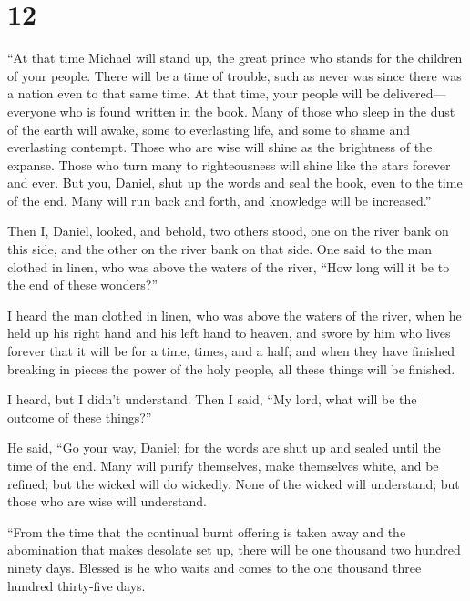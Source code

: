 \hypertarget{section-11}{%
\section{12}\label{section-11}}

 ``At that time Michael will stand up, the great prince
who stands for the children of your people. There will be a time of
trouble, such as never was since there was a nation even to that same
time. At that time, your people will be delivered---everyone who is
found written in the book.  Many of those who sleep in the
dust of the earth will awake, some to everlasting life, and some to
shame and everlasting contempt.  Those who are wise will
shine as the brightness of the expanse. Those who turn many to
righteousness will shine like the stars forever and ever. 
But you, Daniel, shut up the words and seal the book, even to the time
of the end. Many will run back and forth, and knowledge will be
increased.''

 Then I, Daniel, looked, and behold, two others stood, one
on the river bank on this side, and the other on the river bank on that
side.  One said to the man clothed in linen, who was above
the waters of the river, ``How long will it be to the end of these
wonders?''

 I heard the man clothed in linen, who was above the
waters of the river, when he held up his right hand and his left hand to
heaven, and swore by him who lives forever that it will be for a time,
times, and a half; and when they have finished breaking in pieces the
power of the holy people, all these things will be finished.

 I heard, but I didn't understand. Then I said, ``My lord,
what will be the outcome of these things?''

 He said, ``Go your way, Daniel; for the words are shut up
and sealed until the time of the end.  Many will purify
themselves, make themselves white, and be refined; but the wicked will
do wickedly. None of the wicked will understand; but those who are wise
will understand.

 ``From the time that the continual burnt offering is
taken away and the abomination that makes desolate set up, there will be
one thousand two hundred ninety days.  Blessed is he who
waits and comes to the one thousand three hundred thirty-five days.

